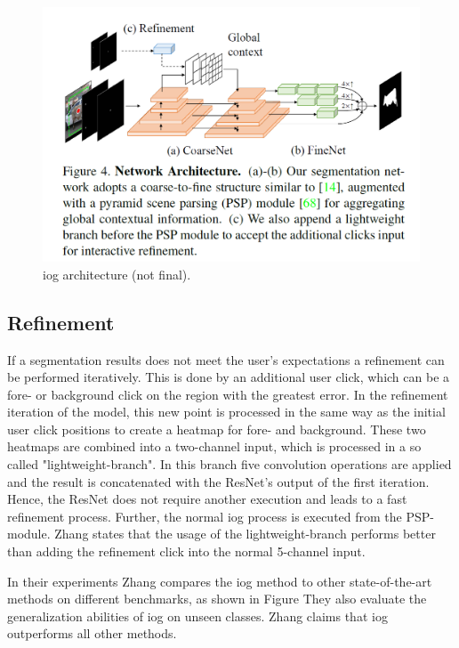 \begin{figure}
	\includegraphics[width=\linewidth]{figures/chap31_arch.png}
	\caption[IOG Architecture]{\gls{iog} architecture (not final).}
	\label{fig:ch3:sec1:arch}
\end{figure}

\subsection{Refinement}\label{ord:ch3:sec1:subsec3}
If a segmentation results does not meet the user's expectations a refinement can be performed iteratively. 
This is done by an additional user click, which can be a fore- or background click on the region with the greatest error. 
In the refinement iteration of the model, this new point is processed in the same way as the initial user click positions to create a heatmap for fore- and background.
These two heatmaps are combined into a two-channel input, which is processed in a so called "lightweight-branch". 
In this branch five convolution operations are applied and the result is concatenated with the ResNet's output of the first iteration.
Hence, the ResNet does not require another execution and leads to a fast refinement process.
Further, the normal \gls{iog} process is executed from the PSP-module. 
Zhang states that the usage of the lightweight-branch performs better than adding the refinement click into the normal 5-channel input.

In their experiments Zhang compares the \gls{iog} method to other state-of-the-art methods on different benchmarks, as shown in Figure %
They also evaluate the generalization abilities of \gls{iog} on unseen classes.
Zhang claims that \gls{iog} outperforms all other methods.

